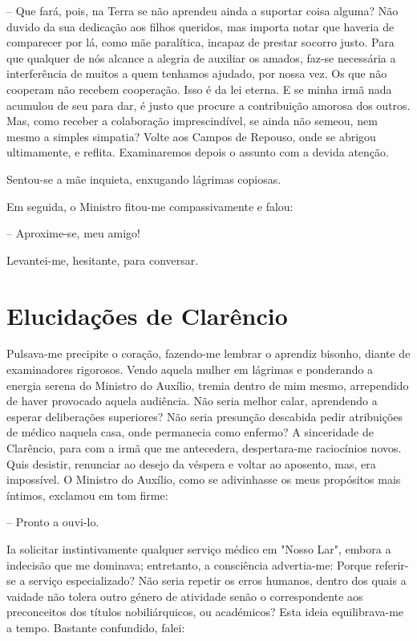 \documentclass[portuguese,12pt,a4paper]{scrbook}
\begin{document}
	– Que fará, pois, na Terra se não aprendeu ainda a suportar coisa alguma? Não duvido da sua dedicação aos filhos queridos, mas importa notar que haveria de comparecer por lá, como mãe paralítica, incapaz de prestar socorro justo. Para que qualquer de nós alcance a alegria de auxiliar os amados, faz-se necessária a interferência de muitos a quem tenhamos ajudado, por nossa vez. Os que não cooperam não recebem cooperação. Isso é da lei eterna. E se minha irmã nada acumulou de seu para dar, é justo que procure a contribuição amorosa dos outros. Mas, como receber a colaboração imprescindível, se ainda não semeou, nem mesmo a simples simpatia? Volte aos Campos de Repouso, onde se abrigou ultimamente, e reflita. Examinaremos depois o assunto com a devida atenção.
	
	Sentou-se a mãe inquieta, enxugando lágrimas copiosas.
	
	Em seguida, o Ministro fitou-me compassivamente e falou:
	
	– Aproxime-se, meu amigo!
	
	Levantei-me, hesitante, para conversar.
	
	
	\chapter{Elucidações de Clarêncio}
	
	Pulsava-me precipite o coração, fazendo-me lembrar o aprendiz bisonho, diante de examinadores rigorosos. Vendo aquela mulher em lágrimas e ponderando a energia serena do Ministro do Auxílio, tremia dentro de mim mesmo, arrependido de haver provocado aquela audiência. Não seria melhor calar, aprendendo a esperar deliberações superiores? Não seria presunção descabida pedir atribuições de médico naquela casa, onde permanecia como enfermo? A sinceridade de Clarêncio, para com a irmã que me antecedera, despertara-me raciocínios novos. Quis desistir, renunciar ao desejo da véspera e voltar ao aposento, mas, era impossível. O Ministro do Auxílio, como se adivinhasse os meus propósitos mais íntimos, exclamou em tom firme:
	
	– Pronto a ouvi-lo.
	
	Ia solicitar instintivamente qualquer serviço médico em "Nosso Lar", embora a indecisão que me dominava; entretanto, a consciência advertia-me: Porque referir-se a serviço especializado? Não seria repetir os erros humanos, dentro dos quais a vaidade não tolera outro género de atividade senão o correspondente aos preconceitos dos títulos nobiliárquicos, ou académicos? Esta ideia equilibrava-me a tempo. Bastante confundido, falei:
	
\end{document}
